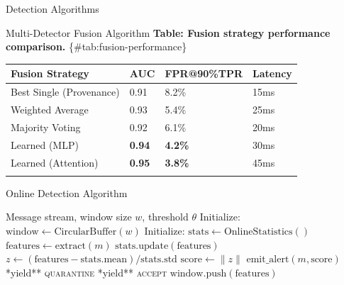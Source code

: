 \documentclass[
  ignorenonframetext,
]{beamer}
\newcounter{none} %
\begin{document}
\begin{frame}{Detection Algorithms}
\begin{block}{Multi-Detector Fusion Algorithm}
\textbf{Table: Fusion strategy performance comparison.}
\{\#tab:fusion-performance\}

{\def\LTcaptype{none} %
\begin{longtable}[]{@{}llll@{}}
\toprule\noalign{}
Fusion Strategy & AUC & FPR@90\%TPR & Latency \\
\midrule\noalign{}
\endhead
Best Single (Provenance) & 0.91 & 8.2\% & 15ms \\
Weighted Average & 0.93 & 5.4\% & 25ms \\
Majority Voting & 0.92 & 6.1\% & 20ms \\
Learned (MLP) & \textbf{0.94} & \textbf{4.2\%} & 30ms \\
Learned (Attention) & \textbf{0.95} & \textbf{3.8\%} & 45ms \\
\bottomrule\noalign{}
\end{longtable}
}
\end{block}

\begin{block}{Online Detection Algorithm}
\protect{}\label{online-detection-algorithm}
\begin{algorithm}
\caption{Online Detection Loop}
\label{alg:online-detection}
\begin{algorithmic}[1]
\Require Message stream, window size $w$, threshold $\theta$
\State Initialize: $\text{window} \gets \text{CircularBuffer}(w)$
\State Initialize: $\text{stats} \gets \text{OnlineStatistics}()$
\Loop {}
    \State $\text{features} \gets \text{extract}(m)$
    \State $\text{stats}.\text{update}(\text{features})$
    \State $z \gets (\text{features} - \text{stats}.\text{mean}) / \text{stats}.\text{std}$
    \State $\text{score} \gets \|z\|$
        \State $\text{emit\_alert}(m, \text{score})$
        \State **yield** \textsc{quarantine}
    \Else
        \State **yield** \textsc{accept}
    \EndIf
    \State $\text{window}.\text{push}(\text{features})$
\EndLoop
\end{algorithmic}
\end{algorithm}
\end{block}


\end{frame}
\end{document}
